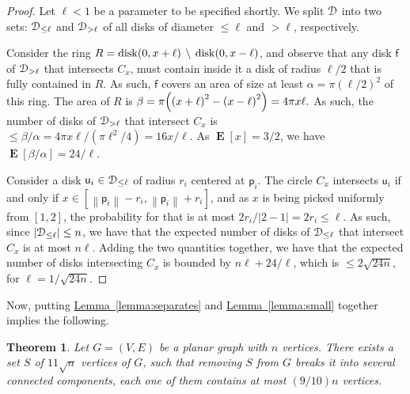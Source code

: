 \documentclass[12pt]{article}
\newtheorem{theorem}{Theorem}[section]
\theoremstyle{remark}\theoremheaderfont{\sf}\theorembodyfont{\upshape}\newtheorem{defn}[theorem]{Definition}
\newcommand{\HLink}[2]{\hyperref[#2]{#1~\ref*{#2}}}
\newcommand{\lemref}[1]{\HLink{Lemma}{lemma:#1}}
\newcommand{\thmlab}[1]{{\label{theo:#1}}}
\newcommand{\DSet}{\EuScript{D}}\newcommand{\PntSet}{{P}}\newcommand{\disk}{\mathsf{d}}\newcommand{\diskA}{\mathsf{f}}\newcommand{\diskB}{\mathsf{u}}\newcommand{\diskC}{\mathsf{v}}\newcommand{\pnt}{\mathsf{p}}\newcommand{\pntA}{\mathsf{q}}\newcommand{\pntB}{\mathsf{t}}\newcommand{\AreaX}[1]{\mathrm{area}\pth{#1}}
\newcommand{\Graph}{{G}}
\newcommand{\Vertices}{{V}}\newcommand{\Edges}{{E}}
\newcommand{\pth}[1]{\mleft({#1}\mright)}
\newcommand{\Ex}[2][\!]{\mathop{\mathbf{E}}#1\pbrcx{#2}}
\newcommand{\cardin}[1]{\left| {#1} \right|}\newcommand{\norm}[1]{\left\| {#1} \right\|}
\newcommand{\pbrcx}[1]{\left[ {#1} \right]}
\newcommand{\DSetSmall}{\DSet_{\leq \ell}}
\newcommand{\DSetLarge}{\DSet_{> \ell}}
\newcommand{\diskY}[2]{\mathrm{disk} \pth{#1, #2}}
\begin{document}
\begin{proof}
    Let $\ell < 1$ be a parameter to be specified shortly. We split
    $\DSet$ into two sets: $\DSetSmall$ and $\DSetLarge$ of all disks
    of diameter $\leq \ell$ and $>\ell$, respectively.


    Consider the ring
    $R = \diskY{0}{x+\ell} \,\setminus \, \diskY{0}{x-\ell}$, and
    observe that any disk $\diskA$ of $\DSetLarge$ that intersects
    $C_x$, must contain inside it a disk of radius $\ell/2$ that is
    fully contained in $R$. As such, $\diskA$ covers an area of size
    at least $\alpha = \pi (\ell/2)^2$ of this ring. The area of $R$
    is
    \begin{math}
        \beta = \pi \pth{\pth{x+\ell}^2 - \pth{x-\ell}^2} = 4\pi x
        \ell.
    \end{math}
    As such, the number of disks of $\DSetLarge$ that intersect $C_x$
    is
    \begin{math}
        \leq \beta/\alpha = 4\pi x \ell/(\pi \ell^2/4) = 16x /\ell.
    \end{math}
    As $\Ex{x}=3/2$, we have $\Ex{\beta/\alpha} = 24/\ell$.

    Consider a disk $\diskB_i \in \DSetSmall$ of radius $r_i$ centered
    at $\pnt_i$.  The circle $C_x$ intersects $\diskB_i$ if and only
    if $x \in [\norm{\pnt_i} - r_i, \norm{\pnt_i} + r_i]$, and as $x$
    is being picked uniformly from $[1,2]$, the probability for that
    is at most $2r_i/|2-1| = 2r_i \leq \ell$.  As such, since
    $\cardin{\DSetSmall} \leq n$, we have that the expected number of
    disks of $\DSetSmall$ that intersect $C_x$ is at most $n \ell$.
    Adding the two quantities together, we have that the expected
    number of disks intersecting $C_x$ is bounded by
    $n \ell + 24/\ell$, which is $\leq 2\sqrt{24 n}$, for
    $\ell = 1/\sqrt{24 n}$.
\end{proof}

Now, putting \lemref{separates} and \lemref{small} together implies
the following.

\begin{theorem}\thmlab{separator}Let $\Graph = (\Vertices,\Edges)$ be a planar graph with $n$
    vertices. There exists a set $S$ of $11 \sqrt{n}$ vertices of
    $\Graph$, such that removing $S$ from $\Graph$ breaks it into
    several connected components, each one of them contains at most
    $(9/10)n$ vertices.
\end{theorem}
\end{document}
